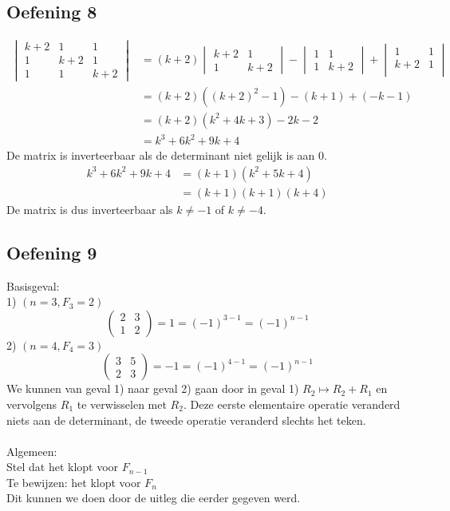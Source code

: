 \documentclass[lineaire_algebra_oplossingen.tex]{subfiles}
\begin{document}
\subsection{Oefening 8}
\begin{align*}
    \begin{vmatrix}
        k+2 & 1 & 1\\
        1 & k+2 & 1\\
        1 & 1 & k+2
    \end{vmatrix}
    &= (k+2) 
    \begin{vmatrix}
        k+2 & 1\\
        1 & k+2    
    \end{vmatrix} - 
    \begin{vmatrix}
        1 & 1\\
        1 & k+2
    \end{vmatrix} + 
    \begin{vmatrix}
        1 & 1\\
        k+2 & 1\\
    \end{vmatrix}\\
    &= (k+2)((k+2)^2 - 1) - (k+1) + (-k-1)\\
    &= (k+2)(k^2 + 4k + 3) -2k - 2\\
    &= k^3 + 6k^2 + 9k + 4
\end{align*}
De matrix is inverteerbaar als de determinant niet gelijk is aan 0.
\begin{align*}
    k^3 + 6k^2 + 9k + 4 &= (k+1)(k^2 + 5k + 4)\\
    &= (k+1)(k+1)(k+4)
\end{align*}
De matrix is dus inverteerbaar als $k \neq -1$ of $k \neq -4$.

\subsection{Oefening 9}
Basisgeval: \\
1) $(n=3, F_{3}=2)$
\[ 
\begin{pmatrix}
2 & 3\\ 
1 & 2
\end{pmatrix}
= 1 = (-1)^{3-1} = (-1)^{n-1}
\]
2) $(n=4, F_{4}=3)$
\[
\begin{pmatrix}
3 & 5\\ 
2 & 3
\end{pmatrix}
= -1 = (-1)^{4-1} = (-1)^{n-1}
\]
We kunnen van geval 1) naar geval 2) gaan door in geval 1) $R_2 \longmapsto R_2+R_1$ en vervolgens $R_1$ te verwisselen met $R_2$. Deze eerste elementaire operatie veranderd niets aan de determinant, de tweede operatie veranderd slechts het teken. \\
\\
Algemeen:\\
Stel dat het klopt voor $F_{n-1}$\\
Te bewijzen: het klopt voor $F_{n}$\\
Dit kunnen we doen door de uitleg die eerder gegeven werd.
\end{document}
